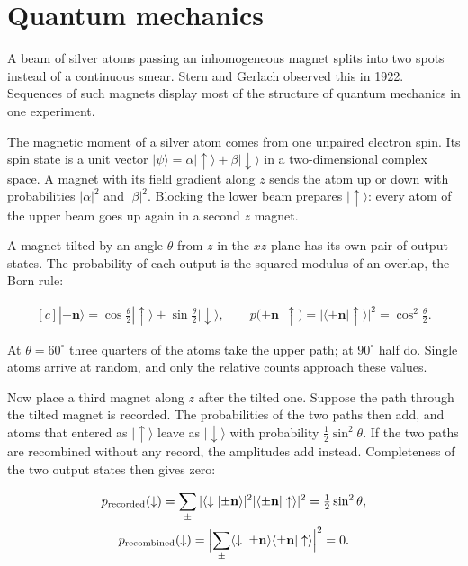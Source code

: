 \documentclass[11pt,oneside]{book}
\newenvironment{centeredalign}{\[\begin{gathered}[c]}{\end{gathered}\]}
\begin{document}
\section{Quantum mechanics}

\label{topic:quantum-mechanics}

A beam of silver atoms passing an inhomogeneous magnet splits into two spots instead of a continuous smear. Stern and Gerlach observed this in 1922. Sequences of such magnets display most of the structure of quantum mechanics in one experiment.

The magnetic moment of a silver atom comes from one unpaired electron spin. Its spin state is a unit vector \(|\psi\rangle=\alpha|\uparrow\rangle+\beta|\downarrow\rangle\) in a two-dimensional complex space. A magnet with its field gradient along \(z\) sends the atom up or down with probabilities \(|\alpha|^2\) and \(|\beta|^2\). Blocking the lower beam prepares \(|\uparrow\rangle\): every atom of the upper beam goes up again in a second \(z\) magnet.

A magnet tilted by an angle \(\theta\) from \(z\) in the \(xz\) plane has its own pair of output states. The probability of each output is the squared modulus of an overlap, the Born rule:

\begin{centeredalign}
|{+}\mathbf n\rangle=\cos\tfrac\theta2|\uparrow\rangle+\sin\tfrac\theta2|\downarrow\rangle,\qquad
p({+}\mathbf n\,|\uparrow)=|\langle{+}\mathbf n|\uparrow\rangle|^2=\cos^2\tfrac\theta2.
\end{centeredalign}

At \(\theta=60^\circ\) three quarters of the atoms take the upper path; at \(90^\circ\) half do. Single atoms arrive at random, and only the relative counts approach these values.

Now place a third magnet along \(z\) after the tilted one. Suppose the path through the tilted magnet is recorded. The probabilities of the two paths then add, and atoms that entered as \(|\uparrow\rangle\) leave as \(|\downarrow\rangle\) with probability \(\tfrac12\sin^2\theta\). If the two paths are recombined without any record, the amplitudes add instead. Completeness of the two output states then gives zero:

\begin{centeredalign}
p_{\rm recorded}(\downarrow)=\sum_\pm|\langle\downarrow|{\pm}\mathbf n\rangle|^2|\langle{\pm}\mathbf n|\uparrow\rangle|^2
=\tfrac12\sin^2\theta,\\
p_{\rm recombined}(\downarrow)=\Bigl|\sum_\pm\langle\downarrow|{\pm}\mathbf n\rangle\langle{\pm}\mathbf n|\uparrow\rangle\Bigr|^2=0.
\end{centeredalign}
\end{document}
